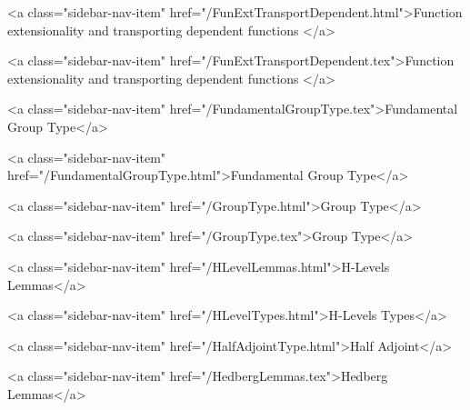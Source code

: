       
    
      
        
          <a class="sidebar-nav-item" href="/FunExtTransportDependent.html">Function extensionality and transporting dependent functions </a>
        
      
    
      
        
          <a class="sidebar-nav-item" href="/FunExtTransportDependent.tex">Function extensionality and transporting dependent functions </a>
        
      
    
      
        
          <a class="sidebar-nav-item" href="/FundamentalGroupType.tex">Fundamental Group Type</a>
        
      
    
      
        
          <a class="sidebar-nav-item" href="/FundamentalGroupType.html">Fundamental Group Type</a>
        
      
    
      
        
          <a class="sidebar-nav-item" href="/GroupType.html">Group Type</a>
        
      
    
      
        
          <a class="sidebar-nav-item" href="/GroupType.tex">Group Type</a>
        
      
    
      
        
          <a class="sidebar-nav-item" href="/HLevelLemmas.html">H-Levels Lemmas</a>
        
      
    
      
        
          <a class="sidebar-nav-item" href="/HLevelTypes.html">H-Levels Types</a>
        
      
    
      
        
          <a class="sidebar-nav-item" href="/HalfAdjointType.html">Half Adjoint</a>
        
      
    
      
        
          <a class="sidebar-nav-item" href="/HedbergLemmas.tex">Hedberg Lemmas</a>
        
      
    
      
        

